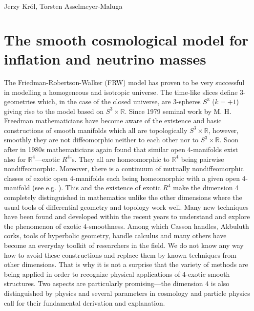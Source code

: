 \begin{artengenv2auth}{Jerzy Kr\'ol, Torsten Asselmeyer-Maluga}
\section{The smooth cosmological model for inflation and neutrino masses}\label{sec:2}
The Friedman-Robertson-Walker (FRW) model has proven to be very successful in modelling a homogeneous and isotropic universe.
The time-like slices define 3-geometries which, in the case of the closed universe, are 3-spheres $S^3$ ($k=+1$) giving rise to the model based on $S^3\times \mathbb{R}$. Since 1979 seminal work by M. H. Freedman \parencite*{Freedman1979} mathematicians have become aware of the existence and basic constructions of smooth manifolds which all are topologically $S^3\times \mathbb{R}$, however, smoothly they are not diffeomorphic neither to each other nor to $S^3\times \mathbb{R}$. Soon after in 1980s mathematicians again found that similar open 4-manifolds exist also for $\mathbb{R}^4$---exotic $R^4$'s. They all are homeomorphic to $\mathbb{R}^4$ being pairwise nondiffeomorphic. Moreover, there is a continuum of mutually nondiffeomorphic classes of exotic open \mbox{4-manifolds} each being homeomorphic with a given open 4-manifold (see e.g. \cite{GS1999}). This and the existence of exotic $R^4$ make the dimension 4 completely distinguished in mathematics unlike the other dimensions where the usual tools of differential geometry and topology work well. Many new techniques have been found and developed within the recent years to understand and explore the phenomenon of exotic 4-smoothness. Among which Casson handles, Akbuluth corks, tools of hyperbolic geometry, handle calculus and many others have become an everyday toolkit of researchers in the field. We do not know any way how to avoid these constructions and replace them by known techniques from other dimensions. That is why it is not a surprise that the variety of methods are being applied in order to recognize physical applications of 4-exotic smooth structures. Two aspects are particularly promising---the dimension 4 is also distinguished by physics and several parameters in cosmology and particle physics call for their fundamental derivation and explanation. 


\end{artengenv2auth}
